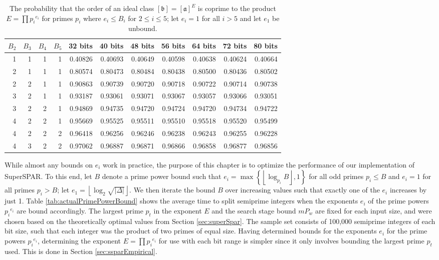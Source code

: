 \documentclass{ucalgthes1}
\theoremstyle{definition}
\DeclareMathOperator{\ord}{ord}
\newcommand{\floor}[1]{\left\lfloor #1 \right\rfloor}
\newcommand{\ideal}{\mathfrak}
\newcommand{\idealclass}[1]{\left[ \ideal #1 \right]}
\newcommand{\aclass}{\idealclass a}
\newcommand{\bclass}{\idealclass b}
\newcommand{\hdelta}{\sqrt{|\Delta|}}
\begin{document}
\begin{table}[htb]
\centering
\begin{tabular}{| r r r r || r | r | r | r | r | r | r |}
	\hline
$B_2$ & $B_3$ & $B_4$ & $B_5$ & 32 bits & 40 bits & 48 bits & 56 bits & 64 bits & 72 bits & 80 bits \\
\hline
1 & 1 & 1 & 1 & 0.40826 & 0.40693 & 0.40649 & 0.40598 & 0.40638 & 0.40624 & 0.40664 \\
2 & 1 & 1 & 1 & 0.80574 & 0.80473 & 0.80484 & 0.80438 & 0.80500 & 0.80436 & 0.80502 \\
2 & 2 & 1 & 1 & 0.90863 & 0.90739 & 0.90720 & 0.90718 & 0.90722 & 0.90714 & 0.90738 \\
3 & 2 & 1 & 1 & 0.93187 & 0.93061 & 0.93071 & 0.93067 & 0.93057 & 0.93066 & 0.93051 \\
3 & 2 & 2 & 1 & 0.94869 & 0.94735 & 0.94720 & 0.94724 & 0.94720 & 0.94734 & 0.94722 \\
4 & 2 & 2 & 1 & 0.95669 & 0.95525 & 0.95511 & 0.95510 & 0.95518 & 0.95520 & 0.95499 \\
4 & 2 & 2 & 2 & 0.96418 & 0.96256 & 0.96246 & 0.96238 & 0.96243 & 0.96255 & 0.96228 \\
4 & 3 & 2 & 2 & 0.97062 & 0.96887 & 0.96871 & 0.96866 & 0.96858 & 0.96877 & 0.96856 \\	
	\hline
\end{tabular}
\caption[The probability that $\ord(\aclass^E)$ is coprime to $E$.]{The probability that the order of an ideal class $\bclass = \aclass ^ E$ is coprime to the product $E = \prod {p_i}^{e_i}$ for primes $p_i$ where $e_i \le B_i$ for $2 \le i \le 5$; let $e_i = 1$ for all $i > 5$ and let $e_1$ be unbound.}
\label{tab:primePowerBound}
\end{table}

While almost any bounds on $e_i$ work in practice, the purpose of this chapter is to optimize the performance of our implementation of SuperSPAR.  To this end, let $B$ denote a prime power bound such that $e_i = \max \left\{ \floor{\log_{p_i} B}, 1 \right\}$ for all odd primes $p_i \le B$ and $e_i = 1$ for all primes $p_i > B$; let $e_1 = \floor{\log_2 \hdelta}$.  We then iterate the bound $B$ over increasing values such that exactly one of the $e_i$ increases by just 1.  Table \ref{tab:actualPrimePowerBound} shows the average time to split semiprime integers when the exponents $e_i$ of the prime powers ${p_i}^{e_i}$ are bound accordingly.  The largest prime $p_t$ in the exponent $E$ and the search stage bound $mP_w$ are fixed for each input size, and were chosen based on the theoretically optimal values from Section \ref{sec:superSpar}.  The sample set consists of 100,000 semiprime integers of each bit size, such that each integer was the product of two primes of equal size.  Having determined bounds for the exponents $e_i$ for the prime powers ${p_i}^{e_i}$, determining the exponent $E = \prod {p_i}^{e_i}$ for use with each bit range is simpler since it only involves bounding the largest prime $p_t$ used.  This is done in Section \ref{sec:ssparEmpirical}.
\end{document}
